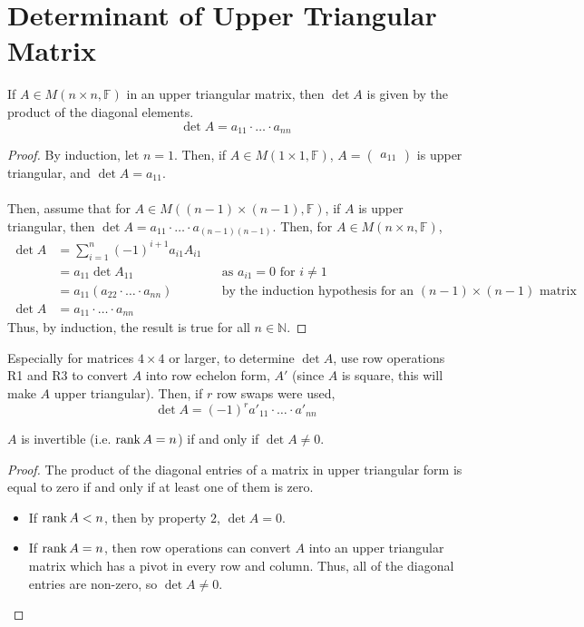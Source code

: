 \documentclass[letterpaper,12pt]{article}
\begin{document}
\section*{Determinant of Upper Triangular Matrix}
\begin{theorem}
If $A \in M(n \times n, \mathbb{F})$ in an upper triangular matrix, then $\det{A}$ is given by the product of the diagonal elements.
\begin{equation*}
    \det{A} = a_{11} \cdot \dots \cdot a_{nn}
\end{equation*}
\end{theorem}
\begin{proof}
By induction, let $n = 1$. Then, if $A \in M(1 \times 1, \mathbb{F})$, $A = \begin{pmatrix} a_{11} \end{pmatrix}$ is upper triangular, and $\det{A} = a_{11}$.
\\ \\ Then, assume that for $A \in M((n-1) \times (n-1), \mathbb{F})$, if $A$ is upper triangular, then $\det{A} = a_{11} \cdot \dots \cdot a_{(n-1)(n-1)}$. Then, for $A \in M(n \times n, \mathbb{F})$,
\begin{align*}
    \det{A} & = \sum_{i=1}^n (-1)^{i+1} a_{i 1} A_{i 1} \\
    & = a_{11} \det{A_{11}} && \text{as $a_{i1} = 0$ for $i \neq 1$} \\
    & = a_{11} (a_{22} \cdot \dots \cdot a_{nn}) && \text{by the induction hypothesis for an $(n-1)\times(n-1)$ matrix} \\
    \det{A} & = a_{11} \cdot \dots \cdot a_{nn}
\end{align*}
Thus, by induction, the result is true for all $n \in \mathbb{N}$.
\end{proof}

\begin{corollary}
Especially for matrices $4 \times 4$ or larger, to determine $\det{A}$, use row operations R1 and R3 to convert $A$ into row echelon form, $A'$ (since $A$ is square, this will make $A$ upper triangular). Then, if $r$ row swaps were used,
\begin{equation*}
    \det{A} = (-1)^r a'_{11} \cdot \dots \cdot a'_{nn}
\end{equation*}
\end{corollary}

\begin{corollary}
$A$ is invertible (i.e. $\operatorname{rank}{A} = n$) if and only if $\det{A} \neq 0$.
\end{corollary}
\begin{proof}
The product of the diagonal entries of a matrix in upper triangular form is equal to zero if and only if at least one of them is zero.
\begin{itemize}
    \item If $\operatorname{rank}{A} < n$, then by property $2$, $\det{A} = 0$.
    \item If $\operatorname{rank}{A} = n$, then row operations can convert $A$ into an upper triangular matrix which has a pivot in every row and column. Thus, all of the diagonal entries are non-zero, so $\det{A} \neq 0$.
\end{itemize}
\end{proof}
\end{document}
